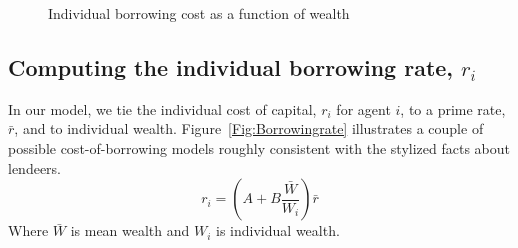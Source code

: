 \begin{figure}
\caption{Individual borrowing cost as a function of wealth}
 \label{Fig:Borrowingratio}
\end{figure}



\subsection{Computing the individual borrowing rate, $r_i$}
In our model, we  tie the individual cost of capital,  $r_i$ for agent $i$, to a prime rate, $\bar r$, and to individual wealth. Figure~\ref{Fig:Borrowingrate} illustrates a couple of possible  cost-of-borrowing models roughly consistent  with the stylized facts about lendeers. 
 \[ r_i = (A + B \frac{\bar{W}}{W_i})\bar r\]
Where $\bar{W}$ is mean wealth and $W_i$ is individual wealth. 


